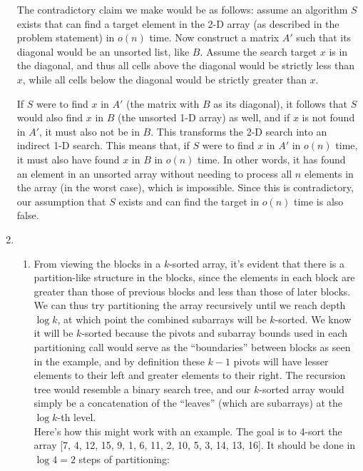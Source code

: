 \documentclass[12pt]{article}
\begin{document}
\begin{enumerate}
    The contradictory claim we make would be as follows: assume an algorithm $S$ exists that can find a target element in the 
    2-D array (as described in the problem statement) in $o(n)$ time. Now construct a matrix $A'$ such that its diagonal would 
    be an unsorted list, like $B$. Assume the search target $x$ is in the diagonal, and thus all cells above the diagonal 
    would be strictly less than $x$, while all cells below the diagonal would be strictly greater than $x$.

    If $S$ were to find $x$ in $A'$ (the matrix with $B$ as its diagonal), it follows that $S$ would also find $x$ in $B$ 
    (the unsorted 1-D array) as well, and if $x$ is not found in $A'$, it must also not be in $B$. This transforms the 2-D 
    search into an indirect 1-D search. This means that, if $S$ were to find $x$ in $A'$ in $o(n)$ time, it must also have found 
    $x$ in $B$ in $o(n)$ time. In other words, it has found an element in an unsorted array without needing to process all $n$ elements 
    in the array (in the worst case), which is impossible. Since this is contradictory, our assumption that $S$ exists and can find the target in 
    $o(n)$ time is also false.
    
    \item 
    \begin{enumerate}
        \item From viewing the blocks in a $k$-sorted array, it's evident that there is a partition-like structure in the blocks, 
        since the elements in each block are greater than those of previous blocks and less than those of later blocks. We can 
        thus try partitioning the array recursively until we reach depth $\log k$, at which point the combined subarrays will be 
        $k$-sorted. We know it will be $k$-sorted because the pivots and subarray bounds used in each partitioning call would serve as the ``boundaries'' 
        between blocks as seen in the example, and by definition these $k - 1$ pivots will have lesser elements to their left 
        and greater elements to their right. The recursion tree would resemble a binary search tree, and our 
        $k$-sorted array would simply be a concatenation of the ``leaves'' (which are subarrays) at the $\log k$-th level.\\

        Here's how this might work with an example. The goal is to 4-sort the array [7, 4, 12, 15, 9, 1, 6, 11, 2, 10, 5, 3, 14, 13, 16]. 
        It should be done in $\log 4 = 2$ steps of partitioning:


\end{enumerate}
\end{enumerate}
\end{document}
